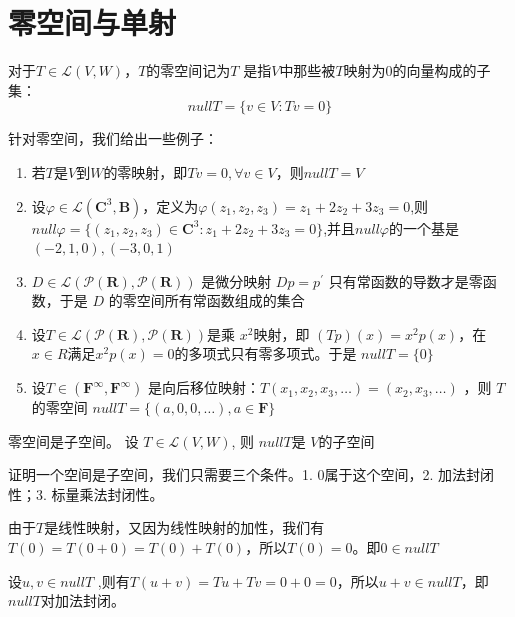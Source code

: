 \documentclass[10pt,a4paper,UTF8]{article}
\begin{document}
\section{零空间与单射}
\label{sec:orgf0f57c4}


\begin{definition}
对于\(T\in \mathcal{L}(V,W)\)，\(T\)的零空间记为\(T\) 是指\(V\)中那些被\(T\)映射为\(0\)的向量构成的子集：\[ null T = \{v\in V: Tv = 0\}\]
\end{definition}

针对零空间，我们给出一些例子：
\begin{instance}
\begin{enumerate}
\item 若\(T\)是\(V\)到\(W\)的零映射，即\(Tv = 0,\forall v\in V\)，则\(null T = V\)
\item 设\(\varphi \in \mathcal{L}(\mathbf{C}^{3},\mathbf{B})\)，定义为\(\varphi (z_{1},z_{2},z_{3}) = z_{1} + 2z_{2} + 3z_{3} =0\),则 \(null \varphi = \{(z_{1},z_{2},z_{3}) \in \mathbf{C}^{3} : z_{1} + 2z_{2} + 3z_{3} = 0\}\),并且\(null \varphi\)的一个基是\((-2,1,0),(-3,0,1)\)
\item \(D \in \mathcal{L}( \mathcal{P}( \mathbf{R}), \mathcal{P}( \mathbf{R}))\) 是微分映射 \(Dp = p^{'}\) 只有常函数的导数才是零函数，于是 \(D\) 的零空间所有常函数组成的集合
\item 设\(T\in \mathcal{L}( \mathcal{P}( \mathbf{R}), \mathcal{P}( \mathbf{R}))\)是乘 \(x^{2}\)映射，即 \((Tp)(x) = x^{2}p(x)\)，在\(x \in R\)满足\(x^{2}p(x) = 0\)的多项式只有零多项式。于是 \(null T = \{0\}\)
\item 设\(T \in ( \mathbf{F}^{\infty}, \mathbf{F}^{\infty})\) 是向后移位映射：\(T(x_{1},x_{2},x_{3},\ldots ) = (x_{2},x_{3},\ldots )\) ，则 \(T\)的零空间 \(null T = \{(a,0,0,\ldots ),a\in \mathbf{F}\}\)
\end{enumerate}
\end{instance}

\begin{theorem}
零空间是子空间。 设 \(T \in \mathcal{L}( V, W)\), 则 \(null T\)是 \(V\)的子空间
\end{theorem}

证明一个空间是子空间，我们只需要三个条件。1. \(0\)属于这个空间，2. 加法封闭性；3. 标量乘法封闭性。

由于\(T\)是线性映射，又因为线性映射的加性，我们有\(T(0) = T(0 + 0) = T(0) + T(0)\)，所以\(T(0) = 0\)。即\(0\in nullT\) 

设\(u,v\in nullT\) ,则有\(T(u+v) = Tu + Tv = 0 + 0 = 0\)，所以\(u+v \in nullT\)，即 \(nullT\)对加法封闭。
\end{document}
